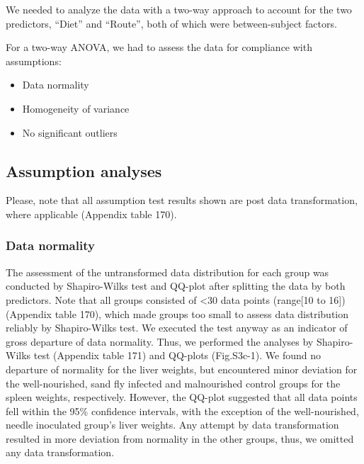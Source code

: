 \documentclass[
  12pt,
  letterpaper,
]{article}
\providecommand{\tightlist}{%
  \setlength{\itemsep}{0pt}\setlength{\parskip}{0pt}}
\begin{document}
We needed to analyze the data with a two-way approach to account for the two predictors, ``Diet'' and ``Route'', both of which were between-subject factors.

For a two-way ANOVA, we had to assess the data for compliance with assumptions:

\begin{itemize}
\tightlist
\item
  Data normality
\item
  Homogeneity of variance
\item
  No significant outliers
\end{itemize}

\subsection{Assumption analyses}\label{assumption-analyses-7}

Please, note that all assumption test results shown are post data transformation, where applicable (Appendix table 170).

\subsubsection{Data normality}\label{data-normality-7}

The assessment of the untransformed data distribution for each group was conducted by Shapiro-Wilks test and QQ-plot after splitting the data by both predictors. Note that all groups consisted of \textless30 data points (range{[}10 to 16{]}) (Appendix table 170), which made groups too small to assess data distribution reliably by Shapiro-Wilks test. We executed the test anyway as an indicator of gross departure of data normality. Thus, we performed the analyses by Shapiro-Wilks test (Appendix table 171) and QQ-plots (Fig.S3c-1). We found no departure of normality for the liver weights, but encountered minor deviation for the well-nourished, sand fly infected and malnourished control groups for the spleen weights, respectively. However, the QQ-plot suggested that all data points fell within the 95\% confidence intervals, with the exception of the well-nourished, needle inoculated group's liver weights. Any attempt by data transformation resulted in more deviation from normality in the other groups, thus, we omitted any data transformation.
\end{document}
